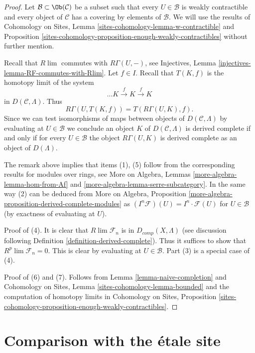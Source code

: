 \begin{proof}
Let $\mathcal{B} \subset \Ob(\mathcal{C})$ be a subset such that every
$U \in \mathcal{B}$ is weakly contractible and every object of $\mathcal{C}$
has a covering by elements of $\mathcal{B}$.
We will use the results of Cohomology on Sites,
Lemma \ref{sites-cohomology-lemma-w-contractible} and
Proposition \ref{sites-cohomology-proposition-enough-weakly-contractibles}
without further mention.

\medskip\noindent
Recall that $R\lim$ commutes with $R\Gamma(U, -)$,
see Injectives, Lemma \ref{injectives-lemma-RF-commutes-with-Rlim}.
Let $f \in I$. Recall that $T(K, f)$ is the homotopy limit
of the system
$$
\ldots K \xrightarrow{f} K \xrightarrow{f} K
$$
in $D(\mathcal{C}, \Lambda)$. Thus
$$
R\Gamma(U, T(K, f)) = T(R\Gamma(U, K), f).
$$
Since we can test isomorphisms of maps between objects of
$D(\mathcal{C}, \Lambda)$ by evaluating at $U \in \mathcal{B}$
we conclude an object $K$ of $D(\mathcal{C}, \Lambda)$
is derived complete if and only if for every $U \in \mathcal{B}$ the
object $R\Gamma(U, K)$ is derived complete as an object of $D(\Lambda)$.

\medskip\noindent
The remark above implies that items (1), (5) follow from the corresponding
results for modules over rings, see
More on Algebra, Lemmas \ref{more-algebra-lemma-hom-from-Af} and
\ref{more-algebra-lemma-serre-subcategory}.
In the same way (2) can be deduced from
More on Algebra, Proposition
\ref{more-algebra-proposition-derived-complete-modules}
as $(I^n\mathcal{F})(U) = I^n \cdot \mathcal{F}(U)$
for $U \in \mathcal{B}$ (by exactness of evaluating at $U$).

\medskip\noindent
Proof of (4). It is clear that $R\lim \mathcal{F}_n$ is in
$D_{comp}(X, \Lambda)$ (see discussion following
Definition \ref{definition-derived-complete}).
Thus it suffices to show that $R^p\lim \mathcal{F}_n = 0$.
This is clear by evaluating at $U \in \mathcal{B}$.
Part (3) is a special case of (4).

\medskip\noindent
Proof of (6) and (7). Follows from
Lemma \ref{lemma-naive-completion}
and
Cohomology on Sites, Lemma \ref{sites-cohomology-lemma-bounded}
and the computation of homotopy limits in Cohomology on Sites,
Proposition \ref{sites-cohomology-proposition-enough-weakly-contractibles}.
\end{proof}





\section{Comparison with the \'etale site}
\label{section-comparison}

